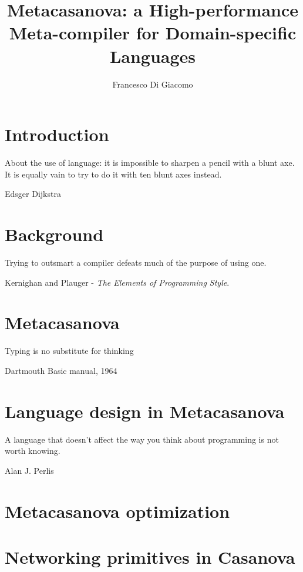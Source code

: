 \documentclass[8pt,a5paper]{extbook}
\author{Francesco Di Giacomo}
\title{Metacasanova: a High-performance Meta-compiler for Domain-specific Languages}
\date { }
\theoremstyle{definition}
\begin{document}

\newpage
\frontmatter
\maketitle

\tableofcontents

\mainmatter

\chapter{Introduction}
\label{ch:introduction}
\epigraph{About the use of language: it is impossible to sharpen a pencil with a blunt axe. It is equally vain to try to do it with ten blunt axes instead.}{Edsger Dijkstra}

	

\chapter{Background}
\label{ch:background}
\epigraph{Trying to outsmart a compiler defeats much of the purpose of using one.}{Kernighan and Plauger - \textit{The Elements of Programming Style}.}

	
\chapter{Metacasanova}
\label{ch:metacasanova}
\epigraph{Typing is no substitute for thinking}{Dartmouth Basic manual, 1964}
		

\chapter{Language design in Metacasanova}
\label{ch:languages}
\epigraph{A language that doesn't affect the way you think about programming is not worth knowing.}{Alan J. Perlis}


\chapter{Metacasanova optimization}
\label{ch:functors}

	
\chapter{Networking primitives in Casanova}
\label{ch:networking}

\end{document}
